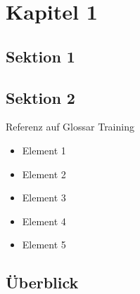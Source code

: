 
\chapter{Kapitel 1}
\blindtext

\section{Sektion 1}
\blindtext
\newpage
\section{Sektion 2}
Referenz auf Glossar \gls{Training}
\Blindtext
\begin{itemize}
    \item Element 1
    \item Element 2
    \item Element 3
    \item Element 4
    \item Element 5
\end{itemize}
\section{Überblick}
\Blindtext